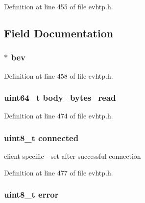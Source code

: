 Definition at line 455 of file evhtp.\-h.



\subsection{Field Documentation}
\hypertarget{structevhtp__connection__s_a56cc56e5934366a7ca14026f5be0b3dd}{
\subsubsection[{bev}]{$\ast$ bev}}\label{structevhtp__connection__s_a56cc56e5934366a7ca14026f5be0b3dd}


Definition at line 458 of file evhtp.\-h.

\hypertarget{structevhtp__connection__s_a1e939d2a1fb4d2559e1447b038b28a03}{
\subsubsection[{body\-\_\-bytes\-\_\-read}]{\setlength{\rightskip}{0pt plus 5cm}uint64\-\_\-t body\-\_\-bytes\-\_\-read}}\label{structevhtp__connection__s_a1e939d2a1fb4d2559e1447b038b28a03}


Definition at line 474 of file evhtp.\-h.

\hypertarget{structevhtp__connection__s_a91553b72c9b4759ddb48feffd7f2ffb1}{
\subsubsection[{connected}]{\setlength{\rightskip}{0pt plus 5cm}uint8\-\_\-t connected}}\label{structevhtp__connection__s_a91553b72c9b4759ddb48feffd7f2ffb1}
client specific -\/ set after successful connection 

Definition at line 477 of file evhtp.\-h.

\hypertarget{structevhtp__connection__s_adc64ccb7538429fe78e3fe0139267370}{
\subsubsection[{error}]{\setlength{\rightskip}{0pt plus 5cm}uint8\-\_\-t error}}\label{structevhtp__connection__s_adc64ccb7538429fe78e3fe0139267370}


